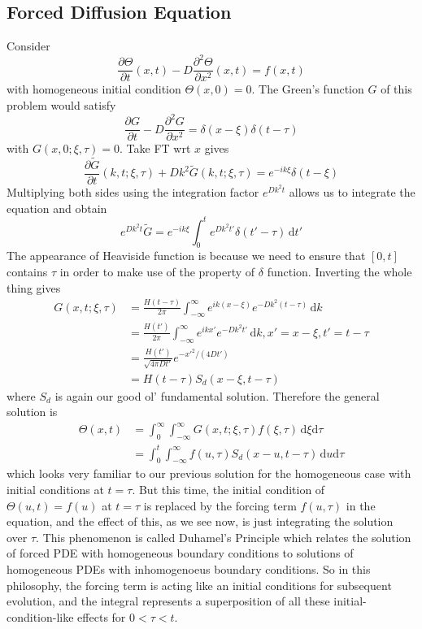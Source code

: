 \subsection{Forced Diffusion Equation}
Consider
$$\frac{\partial\Theta}{\partial t}(x,t)-D\frac{\partial^2\Theta}{\partial x^2}(x,t)=f(x,t)$$
with homogeneous initial condition $\Theta(x,0)=0$.
The Green's function $G$ of this problem would satisfy
$$\frac{\partial G}{\partial t}-D\frac{\partial^2G}{\partial x^2}=\delta(x-\xi)\delta(t-\tau)$$
with $G(x,0;\xi,\tau)=0$.
Take FT wrt $x$ gives
$$\frac{\partial \tilde{G}}{\partial t}(k,t;\xi,\tau)+Dk^2\tilde{G}(k,t;\xi,\tau)=e^{-ik\xi}\delta(t-\xi)$$
Multiplying both sides using the integration factor $e^{Dk^2t}$ allows us to integrate the equation and obtain
$$e^{Dk^2t}\tilde{G}=e^{-ik\xi}\int_0^te^{Dk^2t'}\delta(t'-\tau)\,\mathrm dt'$$
The appearance of Heaviside function is because we need to ensure that $[0,t]$ contains $\tau$ in order to make use of the property of $\delta$ function.
Inverting the whole thing gives
\begin{align*}
    G(x,t;\xi,\tau)&=\frac{H(t-\tau)}{2\pi}\int_{-\infty}^\infty e^{ik(x-\xi)}e^{-Dk^2(t-\tau)}\,\mathrm dk\\
    &=\frac{H(t')}{2\pi}\int_{-\infty}^\infty e^{ikx'}e^{-Dk^2t'}\,\mathrm dk,x'=x-\xi,t'=t-\tau\\
    &=\frac{H(t')}{\sqrt{4\pi Dt'}}e^{-x'^2/(4Dt')}\\
    &=H(t-\tau)S_d(x-\xi,t-\tau)
\end{align*}
where $S_d$ is again our good ol' fundamental solution.
Therefore the general solution is
\begin{align*}
    \Theta(x,t)&=\int_0^\infty\int_{-\infty}^\infty G(x,t;\xi,\tau)f(\xi,\tau)\,\mathrm d\xi\mathrm d\tau\\
    &=\int_0^t\int_{-\infty}^\infty f(u,\tau)S_d(x-u,t-\tau)\,\mathrm du\mathrm d\tau
\end{align*}
which looks very familiar to our previous solution for the homogeneous case with initial conditions at $t=\tau$.
But this time, the initial condition of $\Theta(u,t)=f(u)$ at $t=\tau$ is replaced by the forcing term $f(u,\tau)$ in the equation, and the effect of this, as we see now, is just integrating the solution over $\tau$.
This phenomenon is called Duhamel's Principle which relates the solution of forced PDE with homogeneous boundary conditions to solutions of homogeneous PDEs with inhomogenoeus boundary conditions.
So in this philosophy, the forcing term is acting like an initial conditions for subsequent evolution, and the integral represents a superposition of all these initial-condition-like effects for $0<\tau<t$.
